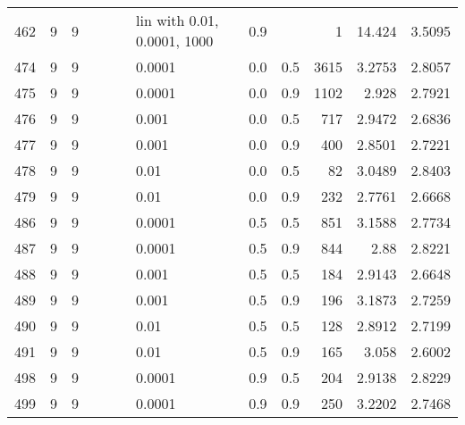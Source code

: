 \begin{longtable}{lrrrrrlrrrrr}
 462 &       9 & 9 &   &   &   & lin with 0.01, 0.0001, 1000 &  0.9 &        &       1 &                 14.424 &                 3.5095 \\
 474 &       9 & 9 &   &   &   &                      0.0001 &  0.0 &    0.5 &    3615 &                 3.2753 &                 2.8057 \\
 475 &       9 & 9 &   &   &   &                      0.0001 &  0.0 &    0.9 &    1102 &                  2.928 &                 2.7921 \\
 476 &       9 & 9 &   &   &   &                       0.001 &  0.0 &    0.5 &     717 &                 2.9472 &                 2.6836 \\
 477 &       9 & 9 &   &   &   &                       0.001 &  0.0 &    0.9 &     400 &                 2.8501 &                 2.7221 \\
 478 &       9 & 9 &   &   &   &                        0.01 &  0.0 &    0.5 &      82 &                 3.0489 &                 2.8403 \\
 479 &       9 & 9 &   &   &   &                        0.01 &  0.0 &    0.9 &     232 &                 2.7761 &                 2.6668 \\
 486 &       9 & 9 &   &   &   &                      0.0001 &  0.5 &    0.5 &     851 &                 3.1588 &                 2.7734 \\
 487 &       9 & 9 &   &   &   &                      0.0001 &  0.5 &    0.9 &     844 &                   2.88 &                 2.8221 \\
 488 &       9 & 9 &   &   &   &                       0.001 &  0.5 &    0.5 &     184 &                 2.9143 &                 2.6648 \\
 489 &       9 & 9 &   &   &   &                       0.001 &  0.5 &    0.9 &     196 &                 3.1873 &                 2.7259 \\
 490 &       9 & 9 &   &   &   &                        0.01 &  0.5 &    0.5 &     128 &                 2.8912 &                 2.7199 \\
 491 &       9 & 9 &   &   &   &                        0.01 &  0.5 &    0.9 &     165 &                  3.058 &                 2.6002 \\
 498 &       9 & 9 &   &   &   &                      0.0001 &  0.9 &    0.5 &     204 &                 2.9138 &                 2.8229 \\
 499 &       9 & 9 &   &   &   &                      0.0001 &  0.9 &    0.9 &     250 &                 3.2202 &                 2.7468 \\

\end{longtable}
